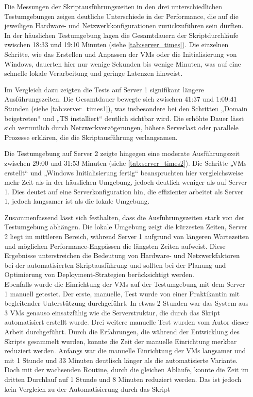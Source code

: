 \documentclass[a4paper,12pt]{article}
\begin{document}
Die Messungen der Skriptausführungszeiten in den drei unterschiedlichen Testumgebungen zeigen deutliche Unterschiede in der Performance, die auf die jeweiligen Hardware- und Netzwerkkonfigurationen zurückzuführen sein dürften. 
In der häuslichen Testumgebung lagen die Gesamtdauern der Skriptdurchläufe zwischen 18:33 und 19:10 Minuten (siehe \autoref{tab:server_times}). 
Die einzelnen Schritte, wie das Erstellen und Anpassen der VMs oder die Initialisierung von Windows, dauerten hier nur wenige Sekunden bis wenige Minuten, was auf eine schnelle lokale Verarbeitung und geringe Latenzen hinweist.

Im Vergleich dazu zeigten die Tests auf Server 1 signifikant längere Ausführungszeiten. 
Die Gesamtdauer bewegte sich zwischen 41:37 und 1:09:41 Stunden (siehe \autoref{tab:server_times1}), was insbesondere bei den Schritten „Domain beigetreten“ und „TS installiert“ deutlich sichtbar wird. 
Die erhöhte Dauer lässt sich vermutlich durch Netzwerkverzögerungen, höhere Serverlast oder parallele Prozesse erklären, die die Skriptausführung verlangsamen.

Die Testumgebung auf Server 2 zeigte hingegen eine moderate Ausführungszeit zwischen 29:00 und 31:53 Minuten (siehe \autoref{tab:server_times2}). 
Die Schritte „VMs erstellt“ und „Windows Initialisierung fertig“ beanspruchten hier vergleichsweise mehr Zeit als in der häuslichen Umgebung, jedoch deutlich weniger als auf Server 1. 
Dies deutet auf eine Serverkonfiguration hin, die effizienter arbeitet als Server 1, jedoch langsamer ist als die lokale Umgebung.

Zusammenfassend lässt sich festhalten, dass die Ausführungszeiten stark von der Testumgebung abhängen. 
Die lokale Umgebung zeigt die kürzesten Zeiten, Server 2 liegt im mittleren Bereich, während Server 1 aufgrund von längeren Wartezeiten und möglichen Performance-Engpässen die längsten Zeiten aufweist. 
Diese Ergebnisse unterstreichen die Bedeutung von Hardware- und Netzwerkfaktoren bei der automatisierten Skriptausführung und sollten bei der Planung und Optimierung von Deployment-Strategien berücksichtigt werden.\\

Ebenfalls wurde die Einrichtung der VMs auf der Testumgebung mit dem Server 1 manuell getestet. Der erste, manuelle, Test wurde von einer Praktikantin mit begleitender Unterstützung durchgeführt.
In etwas 2 Stunden war das System aus 3 VMs genauso einsatzfähig wie die Serverstruktur, die durch das Skript automatisiert erstellt wurde. Drei weitere manuelle Test wurden vom Autor dieser Arbeit durchgeführt.
Durch die Erfahrungen, die während der Entwicklung des Skripts gesammelt wurden, konnte die Zeit der manuelle Einrichtung merkbar reduziert werden.
Anfangs war die manuelle Einrichtung der VMs langsamer und mit 1 Stunde und 33 Minuten deutlisch länger als die automatisierte Variante.
Doch mit der wachsenden Routine, durch die gleichen Abläufe, konnte die Zeit im dritten Durchlauf auf 1 Stunde und 8 Minuten reduziert werden.
Das ist jedoch kein Vergleich zu der Automatisierung durch das Skript\\
\end{document}
